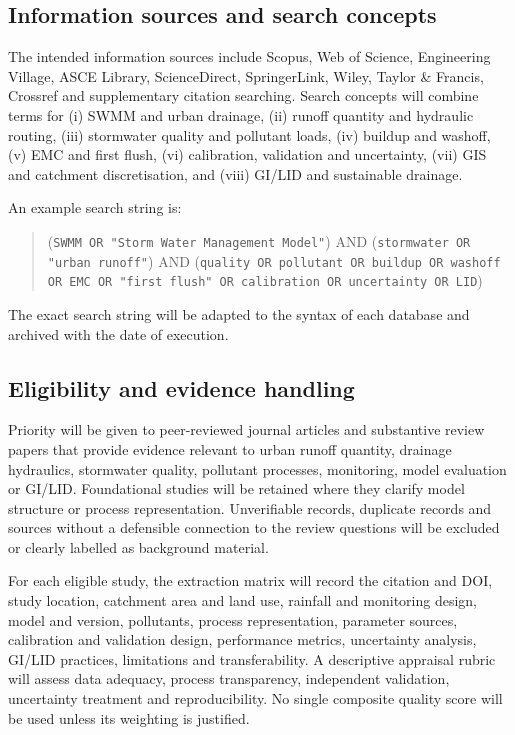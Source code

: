 \documentclass[journal]{IEEEtran}
\begin{document}
\subsection{Information sources and search concepts}
The intended information sources include Scopus, Web of Science, Engineering Village, ASCE Library, ScienceDirect, SpringerLink, Wiley, Taylor \& Francis, Crossref and supplementary citation searching. Search concepts will combine terms for (i) SWMM and urban drainage, (ii) runoff quantity and hydraulic routing, (iii) stormwater quality and pollutant loads, (iv) buildup and washoff, (v) EMC and first flush, (vi) calibration, validation and uncertainty, (vii) GIS and catchment discretisation, and (viii) GI/LID and sustainable drainage.

An example search string is:
\begin{quote}
(\texttt{SWMM OR "Storm Water Management Model"}) AND
(\texttt{stormwater OR "urban runoff"}) AND
(\texttt{quality OR pollutant OR buildup OR washoff OR EMC OR "first flush" OR calibration OR uncertainty OR LID})
\end{quote}
The exact search string will be adapted to the syntax of each database and archived with the date of execution.

\subsection{Eligibility and evidence handling}
Priority will be given to peer-reviewed journal articles and substantive review papers that provide evidence relevant to urban runoff quantity, drainage hydraulics, stormwater quality, pollutant processes, monitoring, model evaluation or GI/LID. Foundational studies will be retained where they clarify model structure or process representation. Unverifiable records, duplicate records and sources without a defensible connection to the review questions will be excluded or clearly labelled as background material.

For each eligible study, the extraction matrix will record the citation and DOI, study location, catchment area and land use, rainfall and monitoring design, model and version, pollutants, process representation, parameter sources, calibration and validation design, performance metrics, uncertainty analysis, GI/LID practices, limitations and transferability. A descriptive appraisal rubric will assess data adequacy, process transparency, independent validation, uncertainty treatment and reproducibility. No single composite quality score will be used unless its weighting is justified.
\end{document}
